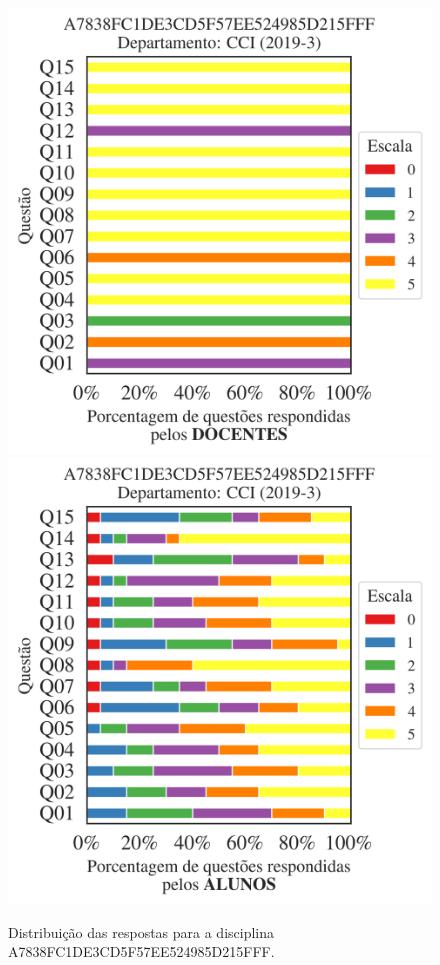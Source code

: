 \documentclass[a4paper,10pt]{article}
\begin{document}
\begin{figure}[h]
\centering
\includegraphics[width=0.485\linewidth]{analise_disciplina_departamento_CCI_A7838FC1DE3CD5F57EE524985D215FFF_docentes.png}
\includegraphics[width=0.485\linewidth]{analise_disciplina_departamento_CCI_A7838FC1DE3CD5F57EE524985D215FFF_alunos.png}
\caption{\label{fig:analise_geral_departamento}                Distribuição das respostas para a disciplina A7838FC1DE3CD5F57EE524985D215FFF. }
\end{figure}
\end{document}
